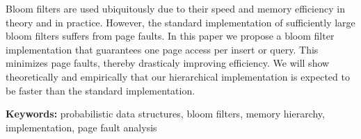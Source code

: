 Bloom filters \cite{Bloom} are used ubiquitously due to their speed and memory efficiency in theory and in practice.
However, the standard implementation of sufficiently large bloom filters suffers from page faults.
In this paper we propose a bloom filter implementation that guarantees one page access per insert or query. This minimizes page faults, thereby drasticaly improving efficiency.
We will show theoretically and empirically that our hierarchical implementation is expected to be faster than the standard implementation.

\noindent\textbf{Keywords:} probabilistic data structures, bloom filters, memory hierarchy, implementation, page fault analysis